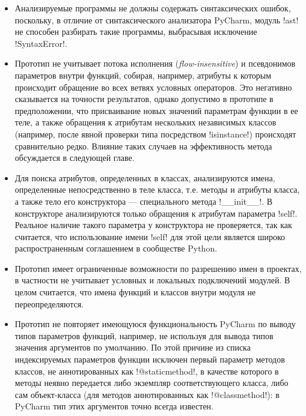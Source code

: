 \begin{itemize} 
  \item Анализируемые программы не должны содержать синтаксических ошибок,
    поскольку, в отличие от синтаксического анализатора PyCharm, модуль !ast! не
    способен разбирать такие программы, выбрасывая исключение !SyntaxError!.

  \item Прототип не учитывает потока исполнения (\emph{flow-insensitive}) и
    псевдонимов параметров внутри функций, собирая, например,
    атрибуты к которым происходит обращение во всех ветвях условных операторов.
    Это негативно сказывается на точности результатов, однако допустимо в
    прототипе в предположении, что присваивание новых значений параметрам
    функции в ее теле, а также обращения к атрибутам нескольких независимых
    классов (например, после явной проверки типа посредством !isinstance!)
    происходят сравнительно редко. Влияние таких случаев на эффективность метода
    обсуждается в следующей главе.

  \item Для поиска атрибутов, определенных в классах, анализируются имена,
    определенные непосредственно в теле класса, т.е. методы и атрибуты
    класса, а также тело его конструктора --- специального метода !__init__!. В
    конструкторе анализируются только обращения к атрибутам параметра !self!.
    Реальное наличие такого параметра у конструктора не проверяется, так как
    считается, что использование имени !self! для этой цели является широко
    распространенным соглашением в сообществе Python.

  \item Прототип имеет ограниченные возможности по разрешению имен в проектах, в
    частности не учитывает условных и локальных подключений модулей. В целом
    считается, что имена функций и классов внутри модуля не
    переопределяются.

  \item Прототип не повторяет имеющуюся функциональность PyCharm по выводу
    типов параметров функций, например, не используя для вывода типов значения
    аргументов по умолчанию. По этой причине из списка индексируемых
    параметров функции исключен первый параметр методов классов, не
    аннотированных как !@staticmethod!, в качестве которого в методы неявно
    передается либо экземпляр соответствующего класса, либо сам объект-класса
    (для методов аннотированных как !@classmethod!): в PyCharm тип этих
    аргументов точно всегда известен.  

\end{itemize}


